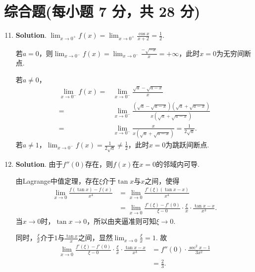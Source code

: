 \documentclass[../main.tex]{subfiles}
\begin{document}
\section{综合题(每小题 7 分，共 28 分)}
\begin{enumerate}
    \setcounter{enumi}{10}
    \item \textbf{Solution}. $\lim_{x\to 0^+}f(x)=\lim_{x\to 0^+}\frac{\cos
                  x}{x+2}=\frac{1}{2}$.

          若$a=0$，则$\lim_{x\to 0^-}f(x)=\lim_{x\to 0^-}\frac{-\sqrt{-x}}{x}=+\infty$，此时$x
              =0$为无穷间断点.

          若$a\neq0$，
          \[
              \begin{aligned}
                  \lim_{x\to 0^-}f(x)= {} & \lim_{x\to 0^-}\frac{\sqrt{a}-\sqrt{a-x}}{x}                                      \\
                  = {}                    & \lim_{x\to
                                                0^-}\frac{(\sqrt{a}-\sqrt{a-x})(\sqrt{a}+\sqrt{a-x})}{x(\sqrt{a}+\sqrt{a-x})} \\
                  = {}                    & \lim_{x\to 0^-}\frac{x}{x(\sqrt{a}+\sqrt{a-x})}=\frac{1}{2\sqrt{a}}.
              \end{aligned}
          \]
          若$a\neq 1$，$\lim_{x\to 0^-}f(x)=\frac{1}{2\sqrt{a}}\neq \frac{1}{2}$，此时$x
              =0$为跳跃间断点.

    \item \textbf{Solution}. 由于$f''(0)$存在，则$f(x)$在$x=0$的邻域内可导.

          由Lagrange中值定理，存在$\xi$介于$\tan x$与$x$之间，使得
          \[
              \begin{aligned}
                  \lim_{x\to0}\frac{f(\tan x)-f(x)}{x^4} & =\lim_{x\to0}\frac{f'(\xi)(\tan x-x)}{x^4}                                           \\
                                                         & =\lim_{x\to0}\frac{f'(\xi)-f'(0)}{\xi-0}\cdot\frac{\xi}{x}\cdot\frac{\tan x-x}{x^3}.
              \end{aligned}
          \]
          当$x\to0$时，$\tan x\to0$，所以由夹逼准则可知$\xi\to0$.

          同时，$\frac{\xi}{x}$介于$1$与$\frac{\tan x}{x}$之间，显然$\lim_{x\to0}\frac{\xi}{x}
              =1$. 故
          \[
              \begin{aligned}
                  \lim_{x\to0}\frac{f'(\xi)-f'(0)}{\xi-0}\cdot\frac{\xi}{x}\cdot\frac{\tan x-x}{x^3} & =f''(0)\cdot\frac{\sec^2 x-1}{3x^2} \\
                                                                                                     & =\frac{2}{3}.
              \end{aligned}
          \]


\end{enumerate}
\end{document}
